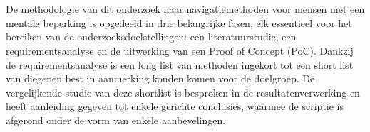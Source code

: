 
\chapter{}%
\label{ch:methodologie}


De methodologie van dit onderzoek naar navigatiemethoden voor mensen met een mentale beperking is opgedeeld in drie belangrijke fasen, elk essentieel voor het bereiken van de onderzoeksdoelstellingen: een literatuurstudie, een requirementsanalyse en de uitwerking van een Proof of Concept (PoC). Dankzij de requirementsanalyse is een long list van methoden ingekort tot een short list van diegenen best in aanmerking konden komen voor de doelgroep. De vergelijkende studie van deze shortlist is besproken in de resultatenverwerking en heeft aanleiding gegeven tot enkele gerichte conclusies, waarmee de scriptie is afgerond onder de vorm van enkele aanbevelingen.

